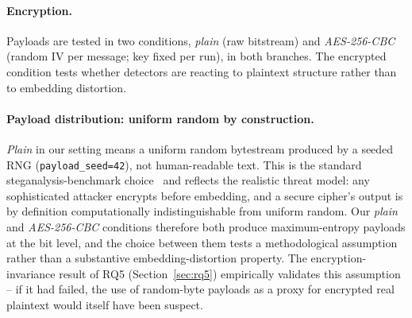 \documentclass[10pt,twocolumn,a4paper]{article}
\begin{document}
\paragraph{Encryption.} Payloads are tested in two conditions, \emph{plain} (raw bitstream) and \emph{AES-256-CBC} (random IV per message; key fixed per run), in both branches. The encrypted condition tests whether detectors are reacting to plaintext structure rather than to embedding distortion.

\paragraph{Payload distribution: uniform random by construction.} \emph{Plain} in our setting means a uniform random bytestream produced by a seeded RNG (\texttt{payload\_seed=42}), not human-readable text. This is the standard steganalysis-benchmark choice~\cite{boroumand2019srnet,holub2015dctr} and reflects the realistic threat model: any sophisticated attacker encrypts before embedding, and a secure cipher's output is by definition computationally indistinguishable from uniform random. Our \emph{plain} and \emph{AES-256-CBC} conditions therefore both produce maximum-entropy payloads at the bit level, and the choice between them tests a methodological assumption rather than a substantive embedding-distortion property. The encryption-invariance result of RQ5 (Section~\ref{sec:rq5}) empirically validates this assumption -- if it had failed, the use of random-byte payloads as a proxy for encrypted real plaintext would itself have been suspect.
\end{document}

